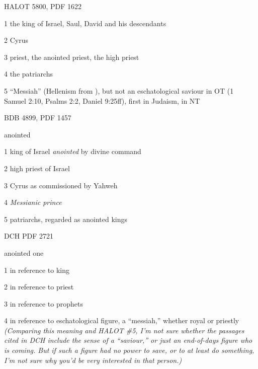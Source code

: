 				\begin{compactdesc}
					\item[HALOT 5800, PDF 1622] \textbf{}
						\begin{compactitem}
							\item[1] the king of Israel, Saul, David and his descendants
							\item[2] Cyrus
							\item[3] priest, the anointed priest, the high priest
							\item[4] the patriarchs
							\item[5] ``Messiah'' (Hellenism from ), but not an eschatological saviour in OT (1 Samuel 2:10, Psalms 2:2, Daniel 9:25ff), first in Judaism,  in NT
						\end{compactitem}
					\item[BDB 4899, PDF 1457] \textbf{}
						\begin{compactitem}
							\item anointed
							\item[1] king of Israel \textit{anointed} by divine command
							\item[2] high priest of Israel
							\item[3] Cyrus as commissioned by Yahweh
							\item[4] \textit{Messianic prince}
							\item[5] patriarchs, regarded as anointed kings
						\end{compactitem}
					\item[DCH PDF 2721] \textbf{}
						\begin{compactitem}
							\item anointed one
							\item[1] in reference to king
							\item[2] in reference to priest
							\item[3] in reference to prophets
							\item[4] in reference to eschatological figure, a ``messiah,'' whether royal or priestly \textit{(Comparing this meaning and HALOT \#5, I'm not sure whether the passages cited in DCH include the sense of a ``saviour,'' or just an end-of-days figure who is coming. But if such a figure had no power to save, or to at least do something, I'm not sure why you'd be very interested in that person.)}
						\end{compactitem}
				\end{compactdesc}
				

